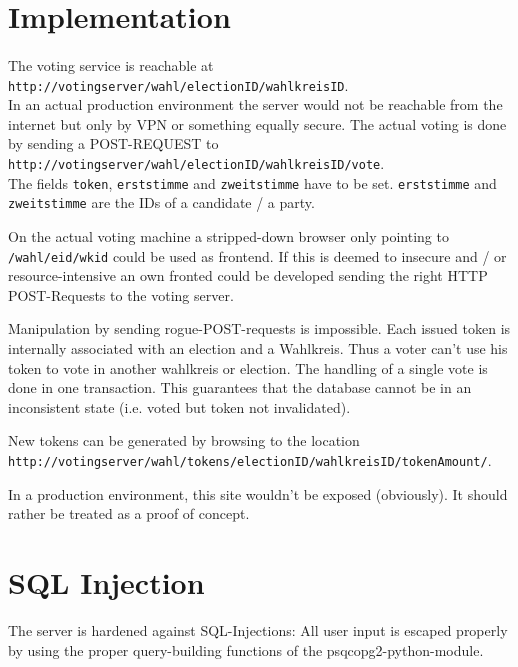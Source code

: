 \documentclass[10pt,a4paper]{article}
\begin{document}
\section*{Implementation}

\paragraph*{}
The voting service is reachable at \\
\texttt{http://votingserver/wahl/electionID/wahlkreisID}. \\
In an actual production environment the server would not be reachable from the internet but only by VPN or something equally secure. The actual voting is done by sending a POST-REQUEST to \\ \texttt{http://votingserver/wahl/electionID/wahlkreisID/vote}. \\
The fields \texttt{token}, \texttt{erststimme} and \texttt{zweitstimme} have to be set. \texttt{erststimme} and \texttt{zweitstimme} are the IDs of a candidate / a party. 

On the actual voting machine a stripped-down browser only pointing to \texttt{/wahl/eid/wkid} could be used as frontend. If this is deemed to insecure and / or resource-intensive an own fronted could be developed sending the right HTTP POST-Requests to the voting server.

Manipulation by sending rogue-POST-requests is impossible. Each issued token is internally associated with an election and a Wahlkreis. Thus a voter can't use his token to vote in another wahlkreis or election. The handling of a single vote is done in one transaction. This guarantees that the database cannot be in an inconsistent state (i.e. voted but token not invalidated).


New tokens can be generated by browsing to the location \\
\texttt{http://votingserver/wahl/tokens/electionID/wahlkreisID/tokenAmount/}.

In a production environment, this site wouldn't be exposed (obviously). It should rather be treated as a proof of concept.
\section*{SQL Injection}
The server is hardened against SQL-Injections: All user input is escaped properly by using the proper query-building functions of the psqcopg2-python-module.
\end{document}
